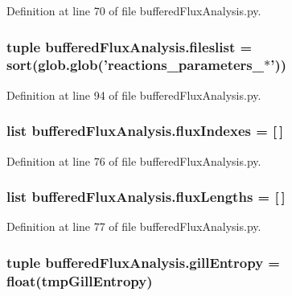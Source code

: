 Definition at line 70 of file buffered\-Flux\-Analysis.\-py.

\hypertarget{namespacebuffered_flux_analysis_a0d1da0381917a4cdca814e4d430ff367}{
\subsubsection[{fileslist}]{\setlength{\rightskip}{0pt plus 5cm}tuple buffered\-Flux\-Analysis.\-fileslist = sort(glob.\-glob('reactions\-\_\-parameters\-\_\-$\ast$'))}}\label{namespacebuffered_flux_analysis_a0d1da0381917a4cdca814e4d430ff367}


Definition at line 94 of file buffered\-Flux\-Analysis.\-py.

\hypertarget{namespacebuffered_flux_analysis_ae24a834136795f8237a6833f27b1d101}{
\subsubsection[{flux\-Indexes}]{\setlength{\rightskip}{0pt plus 5cm}list buffered\-Flux\-Analysis.\-flux\-Indexes = \mbox{[}$\,$\mbox{]}}}\label{namespacebuffered_flux_analysis_ae24a834136795f8237a6833f27b1d101}


Definition at line 76 of file buffered\-Flux\-Analysis.\-py.

\hypertarget{namespacebuffered_flux_analysis_ad325fa6a88238fd68ab3877253a8bfbb}{
\subsubsection[{flux\-Lengths}]{\setlength{\rightskip}{0pt plus 5cm}list buffered\-Flux\-Analysis.\-flux\-Lengths = \mbox{[}$\,$\mbox{]}}}\label{namespacebuffered_flux_analysis_ad325fa6a88238fd68ab3877253a8bfbb}


Definition at line 77 of file buffered\-Flux\-Analysis.\-py.

\hypertarget{namespacebuffered_flux_analysis_ac596e19c308944b3c5504e92aa074de1}{
\subsubsection[{gill\-Entropy}]{\setlength{\rightskip}{0pt plus 5cm}tuple buffered\-Flux\-Analysis.\-gill\-Entropy = float(tmp\-Gill\-Entropy)}}\label{namespacebuffered_flux_analysis_ac596e19c308944b3c5504e92aa074de1}


